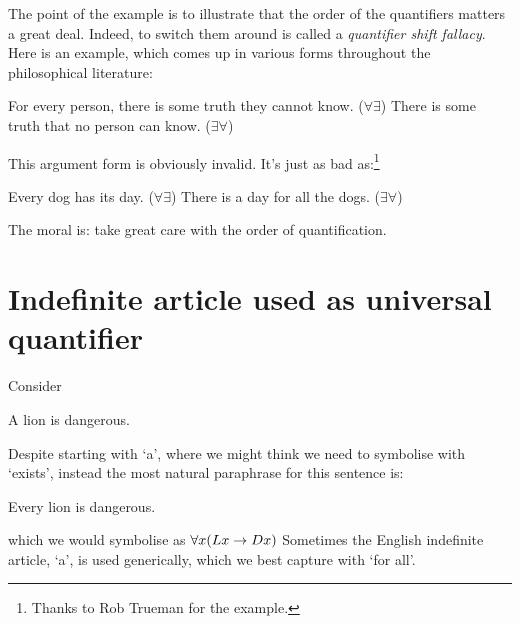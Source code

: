 			The point of the example is to illustrate that the order of the quantifiers matters a great deal. Indeed, to switch them around is called a \emph{quantifier shift fallacy}. Here is an example, which comes up in various forms throughout the philosophical literature:
			\begin{earg}
				\prem For every person, there is some truth they cannot know. \hfill ($\forall \exists$)
				\conc There is some truth that no person can know. \hfill ($\exists \forall$)
			\end{earg}
			This argument form is obviously invalid. It's just as bad as:\footnote{Thanks to Rob Trueman for the example.}
			\begin{earg}
				\prem Every dog has its day. \hfill ($\forall \exists$)
				\conc There is a day for all the dogs. \hfill ($\exists \forall$)
			\end{earg}
			
			
			
			The moral is: take great care with the order of quantification.
			


			\section{Indefinite article used as universal quantifier}
		
			Consider
			\begin{samplesent}
				\item A lion is dangerous.
			\end{samplesent}
			Despite starting with `a', where we might think we need to symbolise with `exists', instead the most natural paraphrase for this sentence is: 
			\begin{samplesent}
				\item Every lion is dangerous.
			\end{samplesent} 
			which we would symbolise as $\forall x(Lx\rightarrow Dx)$
			Sometimes the English indefinite article, `a', is used generically, which we best capture with `for all'. 

